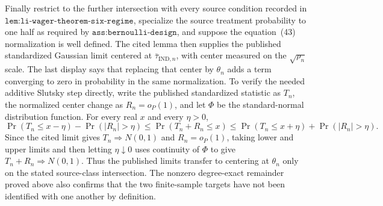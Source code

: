 Finally restrict to the further intersection with every source condition recorded in \(\texttt{lem:li-wager-theorem-six-regime}\), specialize the source treatment probability to one half as required by \(\texttt{ass:bernoulli-design}\), and suppose the equation~(43) normalization is well defined. The cited lemma then supplies the published standardized Gaussian limit centered at \(\bar\tau_{\mathrm{IND},n}\), with center measured on the \(\sqrt{\rho_n}\) scale. The last display says that replacing that center by \(\theta_n\) adds a term converging to zero in probability in the same normalization. To verify the needed additive Slutsky step directly, write the published standardized statistic as \(T_n\), the normalized center change as \(R_n=o_P(1)\), and let \(\Phi\) be the standard-normal distribution function. For every real \(x\) and every \(\eta>0\),
\[
 \Pr(T_n\le x-\eta)-\Pr(|R_n|>\eta)
 \le \Pr(T_n+R_n\le x)
 \le \Pr(T_n\le x+\eta)+\Pr(|R_n|>\eta).
\]
Since the cited limit gives \(T_n\Rightarrow N(0,1)\) and \(R_n=o_P(1)\), taking lower and upper limits and then letting \(\eta\downarrow0\) uses continuity of \(\Phi\) to give \(T_n+R_n\Rightarrow N(0,1)\). Thus the published limits transfer to centering at \(\theta_n\) only on the stated source-class intersection. The nonzero degree-exact remainder proved above also confirms that the two finite-sample targets have not been identified with one another by definition.